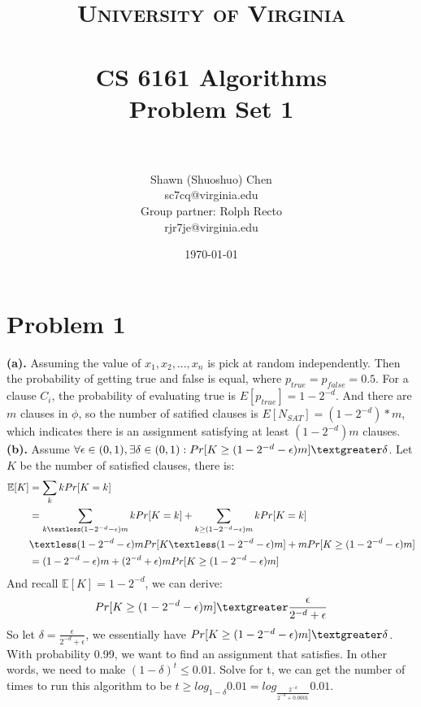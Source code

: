 \documentclass[titlepage, paper=a4, fontsize=11pt]{scrartcl} %
\title{	
\normalfont \normalsize 
\textsc{University of Virginia} \\ [25pt] %
\horrule{0.5pt} \\[0.4cm] %
\huge CS 6161 Algorithms \\
\huge Problem Set 1 \\ %
\horrule{2pt} \\[0.5cm] %
}
\author{Shawn (Shuoshuo) Chen\\sc7cq@virginia.edu\\Group partner: Rolph Recto\\ rjr7je@virginia.edu} %
\date{\normalsize\today} %
\numberwithin{equation}{section} %
\numberwithin{figure}{section} %
\numberwithin{table}{section} %
\begin{document}
\maketitle %


\section*{Problem 1}
\textbf{(a).}
Assuming the value of ${x_1,x_2, ... ,x_n}$ is pick at random independently. Then the probability of getting true
and false is equal, where $p_{true} = p_{false} = 0.5$. For a clause $C_i$, the probability of evaluating true is
$E[p_{true}] = 1-2^{-d}$. And there are $m$ clauses in $\phi$, so the number of satified clauses is
$E[N_{SAT}] = (1-2^{-d}) * m$, which indicates there is an assignment satisfying at least $(1-2^{-d})m$ clauses.
\\

\textbf{(b).}
Assume $\forall \epsilon \in (0,1), \exists \delta \in (0,1): Pr[K \geq (1-2^{-d}-\epsilon)m] \textgreater \delta$.
Let $K$ be the number of satisfied clauses, there is:
\begin{align*} 
\begin{split}
\mathbb{E}[K] &= \sum_{k} kPr[K=k] \\
&= \sum_{k \textless (1-2^{-d}-\epsilon)m} kPr[K=k] + \sum_{k \geq (1-2^{-d}-\epsilon)m} kPr[K=k] \\
&\textless (1-2^{-d}-\epsilon)mPr[K \textless (1-2^{-d}-\epsilon)m] + mPr[K \geq (1-2^{-d}-\epsilon)m] \\
&= (1-2^{-d}-\epsilon)m + (2^{-d}+\epsilon)mPr[K \geq (1-2^{-d}-\epsilon)m] \\
\end{split}
\end{align*}
And recall $\mathbb{E}[K]=1-2^{-d}$, we can derive:
\begin{align*} 
\begin{split}
Pr[K \geq (1-2^{-d}-\epsilon)m] \textgreater \frac{\epsilon}{2^{-d}+\epsilon}
\end{split}
\end{align*}
So let $\delta = \frac{\epsilon}{2^{-d}+\epsilon}$, we essentially have $Pr[K \geq (1-2^{-d}-\epsilon)m] \textgreater \delta$.
With probability 0.99, we want to find an assignment that satisfies. In other words, we need to make $(1-\delta)^t  \leq 0.01$. Solve for t, we can get the number of times to run this algorithm to be $t \geq log_{1-\delta} 0.01 = log_{\frac{2^{-d}}{2^{-d}+0.0001}} 0.01$.
\\
\end{document}
